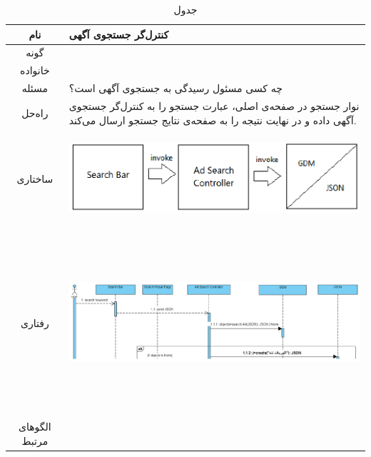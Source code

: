 \begin{table}[H]
	\begin{adjustbox}{width=\textwidth}
		\begin{tabular}{|c|p{\textwidth}|}
			\hline
			نام &
			کنترل‌گر جستجوی آگهی \\ 
			\hline
			گونه & 
			\grasp \\
			\hline
			خانواده &
			\controller \\
			\hline
			مسئله & 
			چه کسی مسئول رسیدگی به جستجوی آگهی است؟\\
			\hline
			راه‌حل& 
نوار جستجو در صفحه‌ی اصلی، عبارت جستجو را به کنترل‌گر جستجوی آگهی داده و در نهایت نتیجه را به صفحه‌ی نتایج جستجو ارسال می‌کند. \\
			\hline
			ساختاری & 
			\begin{minipage}{\textwidth}
				\begin{flushleft}
					\begin{minipage}{\textwidth}
						\includegraphics[width=13cm, height=2.7cm]{./images/7-2-1}
					\end{minipage}
				\end{flushleft}
			\end{minipage}
			
			\\
			\hline
			رفتاری & 
			\begin{minipage}{\textwidth}
				\begin{flushleft}
					\begin{minipage}{\textwidth}
						\includegraphics[width=13.5cm, height=6cm]{./images/7-2-2}
					\end{minipage}
				\end{flushleft}
			\end{minipage}
			\\
			\hline
			الگو‌های مرتبط& \\
			\hline
		\end{tabular}
	\end{adjustbox}
	\caption{جدول }
	\label{table-with-pic:2}
\end{table}

